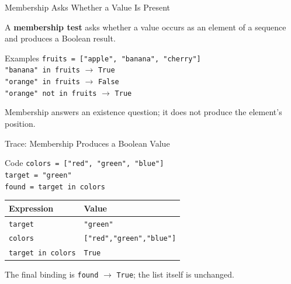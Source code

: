 \documentclass[aspectratio=169,10pt]{beamer}
\begin{document}
\begin{frame}{Membership Asks Whether a Value Is Present}
  \begin{cpdefinition}
    A \textbf{membership test} asks whether a value occurs as an element of a sequence and produces a Boolean result.
  \end{cpdefinition}

  \begin{block}{Examples}
    \texttt{fruits = ["apple", "banana", "cherry"]}\\[0.08in]
    \texttt{"banana" in fruits} $\longrightarrow$ \texttt{True}\\
    \texttt{"orange" in fruits} $\longrightarrow$ \texttt{False}\\
    \texttt{"orange" not in fruits} $\longrightarrow$ \texttt{True}
  \end{block}

  \begin{keyidea}
    Membership answers an existence question; it does not produce the element's position.
  \end{keyidea}
\end{frame}

\begin{frame}{Trace: Membership Produces a Boolean Value}
  \begin{block}{Code}
    \texttt{colors = ["red", "green", "blue"]}\\
    \texttt{target = "green"}\\
    \texttt{found = target in colors}
  \end{block}

  \begin{center}
    \renewcommand{\arraystretch}{1.3}
    \begin{tabular}{l|l}
      \textbf{Expression} & \textbf{Value} \\\hline
      \texttt{target} & \texttt{"green"} \\
      \texttt{colors} & \texttt{["red","green","blue"]} \\
      \texttt{target in colors} & \texttt{True}
    \end{tabular}
  \end{center}

  \begin{keyidea}
    The final binding is \texttt{found} $\rightarrow$ \texttt{True}; the list itself is unchanged.
  \end{keyidea}
\end{frame}
\end{document}

